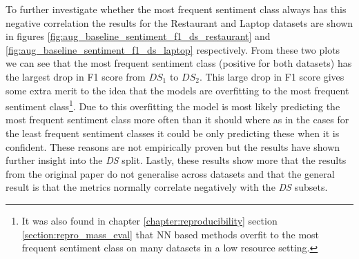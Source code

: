 To further investigate whether the most frequent sentiment class always has this negative correlation the results for the Restaurant and Laptop datasets are shown in figures \ref{fig:aug_baseline_sentiment_f1_ds_restaurant} and \ref{fig:aug_baseline_sentiment_f1_ds_laptop} respectively. From these two plots we can see that the most frequent sentiment class (positive for both datasets) has the largest drop in F1 score from $DS_1$ to $DS_2$. This large drop in F1 score gives some extra merit to the idea that the models are overfitting to the most frequent sentiment class\footnote{It was also found in chapter \ref{chapter:reproducibility} section \ref{section:repro_mass_eval} that NN based methods overfit to the most frequent sentiment class on many datasets in a low resource setting.}. Due to this overfitting the model is most likely predicting the most frequent sentiment class more often than it should where as in the cases for the least frequent sentiment classes it could be only predicting these when it is confident. These reasons are not empirically proven but the results have shown further insight into the \textit{DS} split. Lastly, these results show more that the results from the original paper \citep{wang-etal-2017-tdparse} do not generalise across datasets and that the general result is that the metrics normally correlate negatively with the \textit{DS} subsets. 

